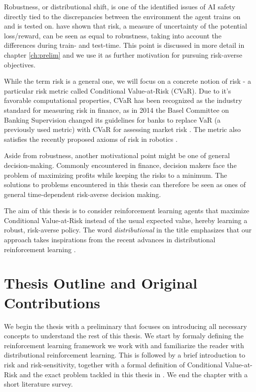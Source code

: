 Robustness, or distributional shift, is one of the identified issues of AI safety \citep{leike2017ai, amodei2016concrete} directly tied to the discrepancies between the environment the agent trains on and is tested on. \citet{chow2015risk} have shown that risk, a measure of uncertainty of the potential loss/reward, can be seen as equal to robustness, taking into account the differences during train- and test-time. This point is discussed in more detail in chapter \ref{ch:prelim} and we use it as further motivation for pursuing risk-averse objectives.

While the term risk is a general one, we will focus on a concrete notion of risk - a particular risk metric called Conditional Value-at-Risk (CVaR). 
Due to it's favorable computational properties, CVaR has been recognized as the industry standard for measuring risk in finance, as in 2014 the Basel Committee on Banking Supervision changed its guidelines for banks to replace VaR (a previously used metric) with CVaR for assessing market risk \citep{basel2013fundamental}. The metric also satisfies the recently proposed axioms of risk in robotics \citep{majumdar2017should}.

Aside from robustness, another motivational point might be one of general decision-making. Commonly encountered in finance, decision makers face the problem of maximizing profits while keeping the risks to a minimum. The solutions to problems encountered in this thesis can therefore be seen as ones of general time-dependent risk-averse decision making.

The aim of this thesis is to consider reinforcement learning agents that maximize Conditional Value-at-Risk instead of the usual expected value, hereby learning a robust, risk-averse policy. The word \textit{distributional} in the title emphasizes that our approach takes inspirations from the recent advances in distributional reinforcement learning \citep{bellemare2017distributional, dabney2017distributional}.



\section{Thesis Outline and Original Contributions}

We begin the thesis with a preliminary  that focuses on introducing all necessary concepts to understand the rest of this thesis. We start by formaly defining the reinforcement learning framework we work with and familiarize the reader with distributional reinforcement learning. This is followed by a brief introduction to risk and risk-sensitivity, together with a formal definition of Conditional Value-at-Risk and the exact problem tackled in this thesis in . We end the chapter with a short literature survey.

